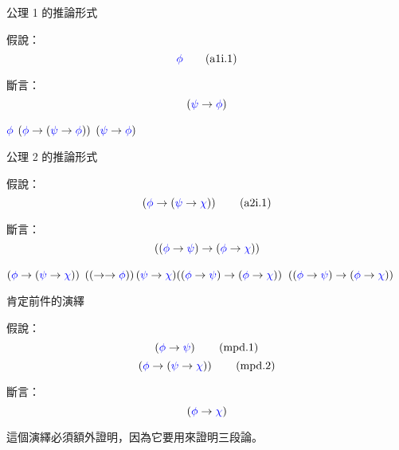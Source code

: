 \documentclass{Slideshow}
\begin{document}
\begin{frame}{公理 1 的推論形式}
    \begin{theorem}[\mmtarget{a1i}]
        假說：
        \[ {\color{blue}\phi} \tag{a1i.1} \]

        斷言：
        \[ \left( {\color{blue}\psi} \to {\color{blue}\phi} \right) \]

        \begin{mmproof}
            \begin{mmtable}{2em}{3em}
                    ${\color{blue}\phi}$
                    \label{a1i:1}
                    $\left( {\color{blue}\phi} \to \left( {\color{blue}\psi} \to {\color{blue}\phi} \right) \right)$
                    \label{a1i:ax-1}
                    $\left( {\color{blue}\psi} \to {\color{blue}\phi} \right)$
            \end{mmtable}
        \end{mmproof}
    \end{theorem}
\end{frame}

\begin{frame}{公理 2 的推論形式}
    \begin{theorem}[\mmtarget{a2i}]
        \newcommand{\hyp}{\wi\wph{\wi\wps\wch}}

        假說：
        \[ \hyp \tag{a2i.1} \]

        斷言：
        \[ \left( \left( {\color{blue}\phi} \to {\color{blue}\psi} \right) \to \left( {\color{blue}\phi} \to {\color{blue}\chi} \right) \right) \]

        \begin{mmproof}
            \begin{mmtable}{2em}{3em}
                    $\hyp$
                    \label{a2i:1}
                    $\wi\hyp{\aIIi\wph\wps\wch}$
                    \label{a2i:ax-2}
                    $\left( \left( {\color{blue}\phi} \to {\color{blue}\psi} \right) \to \left( {\color{blue}\phi} \to {\color{blue}\chi} \right) \right)$
            \end{mmtable}
        \end{mmproof}
    \end{theorem}
\end{frame}

\begin{frame}{肯定前件的演繹}
    \begin{theorem}
        假說：
        \[ \left( {\color{blue}\phi} \to {\color{blue}\psi} \right)          \tag{mpd.1} \]
        \[ \left( {\color{blue}\phi} \to \left( {\color{blue}\psi} \to {\color{blue}\chi} \right) \right) \tag{mpd.2} \]

        斷言：
        \[ \left( {\color{blue}\phi} \to {\color{blue}\chi} \right) \]
    \end{theorem}

    這個演繹必須額外證明，因為它要用來證明三段論。
\end{frame}
\end{document}
